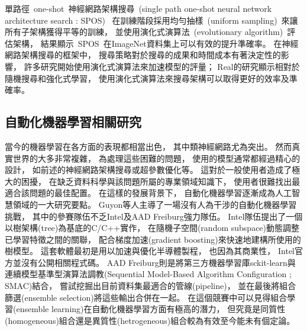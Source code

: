 \documentclass[a4paper,14pt]{extarticle}
\begin{document}
            單路徑~one-shot~神經網路架構搜尋~(single path one-shot neural network architecture search : SPOS)~\cite{guo2020single}
            在訓練階段採用均勻抽樣~(uniform sampling)~來讓所有子架構獲得平等的訓練，
            並使用演化式演算法~(evolutionary algorithm)~評估架構，
            結果顯示~SPOS~在ImageNet資料集上可以有效的提升準確率。
            在神經網路架構搜尋的框架中，
            搜尋策略對於搜尋的成果和時間成本有著決定性的影響，
            許多研究開始使用演化式演算法來加速模型的評量\cite{6791438}；
            Real\cite{real2019regularized}的研究顯示相對於隨機搜尋和強化式學習，
            使用演化式演算法來搜尋架構可以取得更好的效率及準確率。

        \subsection{自動化機器學習相關研究}
            當今的機器學習在各方面的表現都相當出色，
            其中類神經網路尤為突出。
            然而真實世界的大多非常複雜，
            為處理這些困難的問題，
            使用的模型通常都經過精心的設計，
            如前述的神經網路架構搜尋或超參數優化等。
            這對於一般使用者造成了極大的困擾，
            在缺乏資料科學與該問題所屬的專業領域知識下，
            使用者很難找出最適合該問題的最佳配置。
            在這樣的發展背景下，
            自動化機器學習逐漸成為人工智慧領域的一大研究要點。
            Guyon等人\cite{pmlr-v64-guyon_review_2016}主導了一場沒有人為干涉的自動化機器學習挑戰，
            其中的參賽隊伍不乏Intel及AAD Freiburg強力隊伍。
            Intel隊伍提出了一個以樹架構(tree)為基底的C/C++實作，
            在隨機子空間(random subspace)動態調整已學習特徵之間的關聯，
            配合梯度加速(gradient boosting)來快速地建構所使用的樹模型。
            這套軟體最初是用以加速與優化半導體製程，
            也因為其商業性，
            Intel官方並沒有公開相關程式碼。
            AAD Freiburg則是將第三方機器學習庫sckit-learn與連續模型基準型演算法調教(Sequential Model-Based Algorithm Configuration ; SMAC)結合，
            嘗試挖掘出目前資料集最適合的管線(pipeline)，
            並在最後將組合篩選(ensemble selection)將這些輸出合併在一起。
            在這個競賽中可以見得組合學習(ensemble learning)在自動化機器學習方面有極高的潛力，
            但究竟是同質性(homogeneous)組合還是異質性(hetrogeneous)組合較為有效至今能未有個定論。
\end{document}
